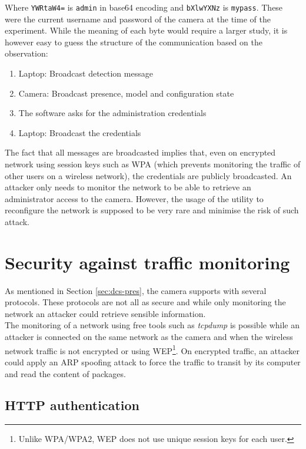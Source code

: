 Where \texttt{YWRtaW4=} is \texttt{admin} in base64 encoding and \texttt{bXlwYXNz} is \texttt{mypass}.
These were the current username and password of the camera at the time of the experiment.
While the meaning of each byte would require a larger study, it is however easy to guess the structure of the communication based on the observation:

\begin{enumerate}
\item Laptop: Broadcast detection message
\item Camera: Broadcast presence, model and configuration state
\item The software asks for the administration credentials
\item Laptop: Broadcast the credentials
\end{enumerate}

The fact that all messages are broadcasted implies that, even on encrypted network using session keys such as WPA (which prevents monitoring the traffic of other users on a wireless network), the credentials are publicly broadcasted.
An attacker only needs to monitor the network to be able to retrieve an administrator access to the camera.
However, the usage of the utility to reconfigure the network is supposed to be very rare and minimise the risk of such attack.

\section{Security against traffic monitoring}
\label{sec:dcs-proto}

As mentioned in Section \ref{sec:dcs-pres}, the camera supports with several protocols.
These protocols are not all as secure and while only monitoring the network an attacker could retrieve sensible information.\\

The monitoring of a network using free tools such as \emph{tcpdump} is possible while an attacker is connected on the same network as the camera and when the wireless network traffic is not encrypted or using WEP\footnote{Unlike WPA/WPA2, WEP does not use unique session keys for each user.}.
On encrypted traffic, an attacker could apply an ARP spoofing attack to force the traffic to transit by its computer and read the content of packages.

\subsection{HTTP authentication}

